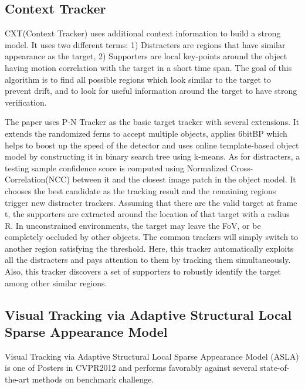 \documentclass{acm_proc_article-sp}
\begin{document}
\subsection{Context Tracker}
    CXT(Context Tracker) uses additional context information to build a strong model. It uses two different terms: 1) Distracters are regions that have similar appearance as the target, 2) Supporters are local key-points around the object having motion correlation with the target in a short time span. The goal of this algorithm is to find all possible regions which look similar to the target to prevent drift, and to look for useful information around the target to have strong verification.
    
    The paper uses P-N Tracker as the basic target tracker with several extensions. It extends the randomized ferns to accept multiple objects, applies 6bitBP which helps to boost up the speed of the detector and uses online template-based object model by constructing it in binary search tree using k-means.
    \newline
    As for distracters, a testing sample confidence score is computed using Normalized Cross-Correlation(NCC) between it and the closest image patch in the object model. It chooses the best candidate as the tracking result and the remaining regions trigger new distracter trackers.
    \newline
    Assuming that there are the valid target at frame t, the supporters are extracted around the location of that target with a radius R.
    \newline
    In unconstrained environments, the target may leave the FoV, or be completely occluded by other objects. The common trackers will simply switch to another region satisfying the threshold. Here, this tracker automatically exploits all the distracters and pays attention to them by tracking them simultaneously. Also, this tracker discovers a set of supporters to robustly identify the target among other similar regions.

\subsection{Visual Tracking via Adaptive Structural Local Sparse Appearance Model}

\label{sec:asla_section}

Visual Tracking via Adaptive Structural Local Sparse Appearance Model (ASLA) is one of Posters in CVPR2012 and performs favorably against several state-of-the-art methods on benchmark challenge.
\end{document}
